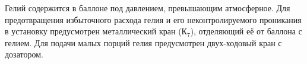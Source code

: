 \documentclass[12pt,a4paper]{article}
\begin{document}
\begin{figure}[h!]
\end{figure} 
 
\item Гелий содержится в баллоне под давлением,  превышающим атмосферное.  Для предотвращения избыточного расхода гелия и его неконтролируемого проникания в установку предусмотрен металлический кран ($К_7$),  отделяющий её от баллона с гелием.  Для подачи малых порций гелия предусмотрен двух-ходовый кран с дозатором.  
\end{document}
